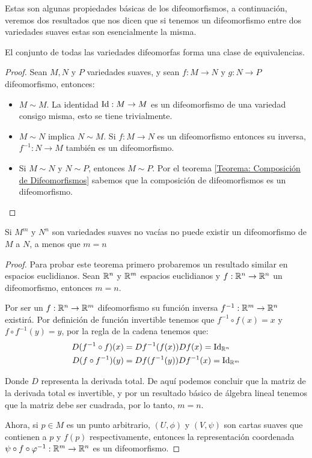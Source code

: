 Estas son algunas propiedades básicas de los difeomorfismos, a continuación, veremos dos resultados que nos dicen que si tenemos un difeomorfismo entre dos variedades suaves estas son esencialmente la misma.

\begin{theorem}
  El conjunto de todas las variedades difeomorfas forma una clase de equivalencias. 
\end{theorem}

\begin{proof} Sean $M,N$ y $P$ variedades suaves, y sean $f: M \to N$ y $g: N \to P$ difeomorfismo, entonces:
  \begin{itemize}
    \item $M \sim M$. La identidad $\mathrm{Id}: M \to M$ es un difeomorfismo de una variedad consigo misma, esto se tiene trivialmente.
    \item $M \sim N$ implica $N \sim M$. Si $f: M \to N$ es un difeomorfismo entonces su inversa, $f^{-1}: N \to M$ también es un difeomorfismo.
    \item Si $M \sim N$ y $N \sim P$, entonces $M \sim P$. Por el teorema \ref{Teorema: Composición de Difeomorfismos} sabemos que la composición de difeomorfismos es un difeomorfismo.
  \end{itemize}
\end{proof}

\begin{theorem}
  Si $M^m$ y $N^n$ son variedades suaves no vacías no puede existir un difeomorfismo de $M$ a $N$, a menos que $m=n$
\end{theorem}

\begin{proof}
  Para probar este teorema primero probaremos un resultado similar en espacios euclidianos. Sean $\mathbb{R}^n$ y $\mathbb{R}^m$ espacios euclidianos y $f: \mathbb{R}^n \to \mathbb{R}^n$ un difeomorfismo, entonces $m = n$.

  Por ser un $f: \mathbb{R}^n \to \mathbb{R}^m$ difeomorfismo su función inversa  $f^{-1}: \mathbb{R}^m \to \mathbb{R}^n$ existirá. Por definición de función invertible tenemos que $f^{-1} \circ f (x) = x$ y $f \circ f^{-1}(y) = y$, por la regla de la cadena tenemos que:
  \begin{align*}
    D(f^{-1} \circ f)(x) &= Df^{-1}(f(x))Df(x) = \mathrm{Id}_{\mathbb{R}^n}\\
    D(f \circ f^{-1})(y) &= Df(f^{-1}(y))Df^{-1}(x) = \mathrm{Id}_{\mathbb{R}^m}
  \end{align*}

  Donde $D$ representa la derivada total. De aquí podemos concluir que la matriz de la derivada total es invertible, y por un resultado básico de álgebra lineal tenemos que la matriz debe ser cuadrada, por lo tanto, $m = n$.

  Ahora, si $p \in M$ es un punto arbitrario, $(U,\phi)$ y $(V,\psi)$ son cartas suaves que contienen a $p$ y $f(p)$ respectivamente, entonces la representación coordenada $\psi \circ f \circ \varphi^{-1}: \mathbb{R}^m \to \mathbb{R}^n$ es un difeomorfismo. 
\end{proof}
